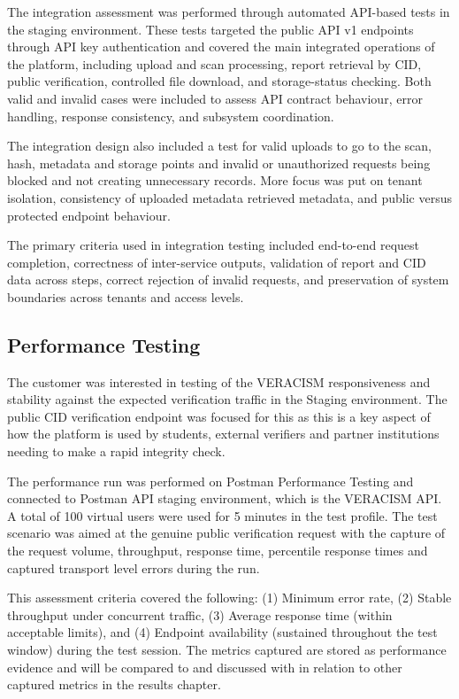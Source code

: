 The integration assessment was performed through automated API-based tests in
the staging environment. These tests targeted the public API v1 endpoints
through API key authentication and covered the main integrated operations of
the platform, including upload and scan processing, report retrieval by CID,
public verification, controlled file download, and storage-status checking.
Both valid and invalid cases were included to assess API contract behaviour,
error handling, response consistency, and subsystem coordination.

The integration design also included a test for valid uploads to go to the scan, hash, metadata and storage points and invalid or unauthorized requests being blocked and not creating unnecessary records. More focus was put on tenant isolation, consistency of uploaded metadata retrieved metadata, and public versus protected endpoint behaviour.

The primary criteria used in integration testing included end-to-end request
completion, correctness of inter-service outputs, validation of report and CID
data across steps, correct rejection of invalid requests, and preservation of
system boundaries across tenants and access levels.

\subsection{Performance Testing}

The customer was interested in testing of the VERACISM responsiveness and stability against the expected verification traffic in the Staging environment. The public CID verification endpoint was focused for this as this is a key aspect of how the platform is used by students, external verifiers and partner institutions needing to make a rapid integrity check.

The performance run was performed on Postman Performance Testing and connected to Postman API staging environment, which is the VERACISM API. A total of 100 virtual users were used for 5 minutes in the test profile. The test scenario was aimed at the genuine public verification request with the capture of the request volume, throughput, response time, percentile response times and captured transport level errors during the run.

This assessment criteria covered the following: (1) Minimum error rate, (2) Stable throughput under concurrent traffic, (3) Average response time (within acceptable limits), and (4) Endpoint availability (sustained throughout the test window) during the test session. The metrics captured are stored as performance evidence and will be compared to and discussed with in relation to other captured metrics in the results chapter.

